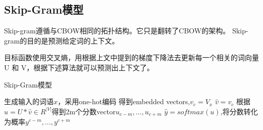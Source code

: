\documentclass[a4paper,AutoFakeBold,oneside,12pt]{book}
\begin{document}
%




\subsection{Skip-Gram模型}

Skip-gram遵循与CBOW相同的拓扑结构。它只是翻转了CBOW的架构。 Skip-gram的目的是预测给定词的上下文。

目标函数使用交叉熵，用根据上文中提到的梯度下降法去更新每一个相关的词向量 U 和 V，根据下述算法就可以预测出上下文了。

\begin{algorithm}
\caption{Skip-Gram模型}
\label{Skip_gram_algorithm}
\begin{algorithmic}[1]
\State 生成输入的词语$x$，采用one-hot编码
\State 得到embedded vectors,$v_{c}=V_x$
\State $\hat{v}=v_c$
\State 根据$u=U*\hat{v}\in R^{|V|}$得到2m个分数vector$u_{c-m},...,u_{c+m}$
\State $\hat{y}=softmax(u)$,将分数转化为概率$y^{c-m},...,y^{c+m}$
\end{algorithmic}
\end{algorithm}


\end{document}
